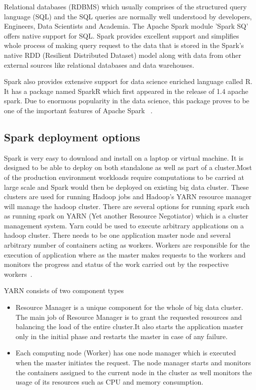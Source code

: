 Relational databases (RDBMS) which usually comprises of the structured query 
language (SQL) and the SQL queries are normally well understood by developers, 
Engineers, Data Scientists and Academia. The Apache Spark module 'Spark SQ' 
offers native support for SQL. Spark provides excellent support and simplifies 
whole process of making query request to the data that is stored in the Spark's 
native RDD (Resilient Distributed Dataset) model along with data from other 
external sources like relational databases and data warehouses.
 
Spark also provides extensive support for data science enriched language called 
R. It has a package named SparkR which first appeared in the release of 1.4 
apache spark. Due to enormous popularity in the data science, this package 
proves to be one of the important features of Apache Spark
~\cite{hid-sp18-410-spark-architecture}.

\subsection{Spark deployment options}
Spark is very easy to download and install on a laptop or virtual machine. 
It is designed to be able to deploy on both standalone as well as part of a 
cluster.Most of the production environment workloads require computations to 
be carried at large scale and Spark would then be deployed on existing big data 
cluster. These clusters are used for running Hadoop jobs and Hadoop's YARN 
resource manager will manage the hadoop cluster. There are several options for 
running  spark such as running spark on YARN (Yet another Resource Negotiator) 
which is a cluster management system.
Yarn could be used to execute arbitrary applications on a hadoop cluster. 
There needs to be one application master node and several arbitrary number of 
containers acting as workers. Workers are responsible for the execution of 
application where as the master makes requests to the workers and monitors the 
progress and status of the work carried out by the respective workers~\cite{hid-sp18-410-spark-architecture}.

YARN consists of two component types

\begin{itemize}

\item Resource Manager is a unique component for the whole of big data cluster. The 
main job of Resource Manager is to grant the requested resources and balancing 
the load of the entire cluster.It also starts the application master only in 
the initial phase and restarts the master in case of any failure.

\item Each computing node (Worker) has one node manager  which is executed when the 
master initiates the request. The node manager starts and monitors the 
containers assigned to the current node in the cluster as well monitors the 
usage of its resources such as CPU and memory consumption.

\end{itemize}

